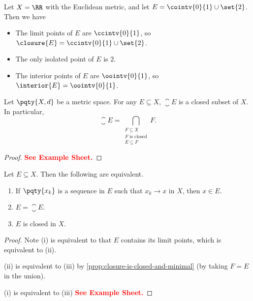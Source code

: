 \begin{example}
    Let \(X = \RR\) with the Euclidean metric, and let \(E = \cointv{0}{1} \cup \set{2}\). Then we have
    \begin{itemize}
        \item The limit points of \(E\) are \(\ccintv{0}{1}\), so \(\closure{E} = \ccintv{0}{1} \cup \set{2}\).
        \item The only isolated point of \(E\) is \(2\).
        \item The interior points of \(E\) are \(\oointv{0}{1}\), so \(\interior{E} = \oointv{0}{1}\).
    \end{itemize}
\end{example}

\begin{proposition}
    \label{prop:closure-is-closed-and-minimal}%
    Let \(\pqty{X, d}\) be a metric space. For any \(E \subseteq X\), \(\closure{E}\) is a closed subset of \(X\). In particular,
    \[
        \closure{E} = \bigcap_{\substack{F \subseteq X \\ F \text{ is closed} \\ E \subseteq F}} F.
    \]
\end{proposition}

\begin{proof}
    \textbf{\textcolor{red}{See Example Sheet.}}
\end{proof}

\begin{proposition}
    \label{prop:characterisation-of-closed-sets}%
    Let \(E \subseteq X\). Then the following are equivalent.

    \begin{enumerate}[label=(\roman*)]
        \item If \(\pqty{x_k}\) is a sequence in \(E\) such that \(x_k \to x\) in \(X\), then \(x \in E\).
        \item \(E = \closure{E}\).
        \item \(E\) is closed in \(X\).
    \end{enumerate}
\end{proposition}

\begin{proof}
    Note (i) is equivalent to that \(E\) contains its limit points, which is equivalent to (ii).

    (ii) is equivalent to (iii) by \autoref{prop:closure-is-closed-and-minimal} (by taking \(F = E\) in the union). 

    (i) is equivalent to (iii) \textbf{\textcolor{red}{See Example Sheet.}}
\end{proof}

